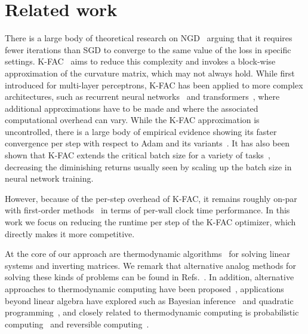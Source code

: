 \section{Related work}
There is a large body of theoretical research on NGD~\cite{amari1998natural, martens2020new, bottou2018optimization} arguing that it requires fewer iterations than SGD to converge to the same value of the loss in specific settings. K-FAC~\cite{martens2015optimizing} aims to reduce this complexity and invokes a block-wise approximation of the curvature matrix, which may not always hold. While first introduced for multi-layer perceptrons, K-FAC has been applied to more complex architectures, such as recurrent neural networks~\cite{martens2018kronecker} and transformers~\cite{eschenhagen2024kronecker}, where additional approximations have to be made and where the associated computational overhead can vary. While the K-FAC approximation is uncontrolled, there is a large body of empirical evidence showing its faster convergence per step with respect to Adam and its variants~\cite{martens2015optimizing, martens2018kronecker, eschenhagen2024kronecker, ren2019efficient,gargiani2020promise}. It has also been shown that K-FAC extends the critical batch size for a variety of tasks~\cite{zhang2019algorithmic}, decreasing the diminishing returns usually seen by scaling up the batch size in neural network training.

However, because of the per-step overhead of K-FAC, it remains roughly on-par with first-order methods~\cite{eschenhagen2024kronecker} in terms of per-wall clock time performance. In this work we focus on reducing the runtime per step of the K-FAC optimizer, which directly makes it more competitive. 





At the core of our approach are thermodynamic algorithms~\cite{aifer2024_TLA} for solving linear systems and inverting matrices. We remark that alternative analog methods for solving these kinds of problems can be found in Refs.~\cite{sun2019solving,
sun2020time}. In addition, alternative approaches to thermodynamic computing have been proposed~\cite{hylton2020thermodynamic,ganesh2017thermodynamic,lipka2024thermodynamic,whitelam2024thermodynamic}, applications beyond linear algebra have explored such as Bayesian inference~\cite{aifer2024_TBI} and quadratic programming~\cite{bartosik2024thermodynamic}, and closely related to thermodynamic computing is probabilistic computing~\cite{aadit2022massively,kaiser2022life} and reversible computing~\cite{frank2020reversible}. 


